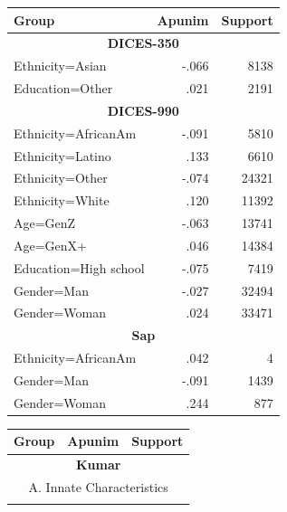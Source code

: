 \documentclass{article} %
\theoremstyle{definition}
\theoremstyle{plain}
\begin{document}
\begin{table}[t]
	\small
	\centering
	\setlength{\tabcolsep}{4pt}
	\begin{minipage}[t]{0.485\textwidth}
		\begin{tabularx}{\linewidth}{X r r}
			\toprule
			\textbf{Group} & \textbf{Apunim} & \textbf{Support} \\
			\midrule
			\multicolumn{3}{c}{\textbf{DICES-350}} \\
			\midrule
			\rowcolor{gray!15}
			Ethnicity=Asian & -.066 & 8138 \\
			Education=Other & .021 & 2191 \\
			\midrule
			\multicolumn{3}{c}{\textbf{DICES-990}} \\
			\midrule
			\rowcolor{gray!15}
			Ethnicity=AfricanAm & -.091 & 5810 \\
			\rowcolor{gray!15}
			Ethnicity=Latino & .133 & 6610 \\
			\rowcolor{gray!15}
			Ethnicity=Other & -.074 & 24321 \\
			\rowcolor{gray!15}
			Ethnicity=White & .120 & 11392 \\
			Age=GenZ & -.063 & 13741 \\
			Age=GenX+ & .046 & 14384 \\
			Education=High school & -.075 & 7419 \\
			\rowcolor{gray!15}
			Gender=Man & -.027 & 32494 \\
			\rowcolor{gray!15}
			Gender=Woman & .024 & 33471 \\
			\midrule
			\multicolumn{3}{c}{\textbf{Sap}} \\
			\midrule
			\rowcolor{gray!15}
			Ethnicity=AfricanAm & .042 & 4 \\
			\rowcolor{gray!15}
			Gender=Man & -.091 & 1439 \\
			\rowcolor{gray!15}
			Gender=Woman & .244 & 877 \\
			\bottomrule
		\end{tabularx}
	\end{minipage}
	\hfill
	\begin{minipage}[t]{0.485\textwidth}
		\begin{tabularx}{\linewidth}{X r r}
			\toprule
			\textbf{Group} & \textbf{Apunim} & \textbf{Support} \\
			\midrule
			\multicolumn{3}{c}{\textbf{Kumar}} \\
			\midrule
			\multicolumn{3}{c}{A. Innate Characteristics} \\
			\midrule
			\rowcolor{gray!15}

\end{tabularx}
\end{minipage}
\end{table}
\end{document}
